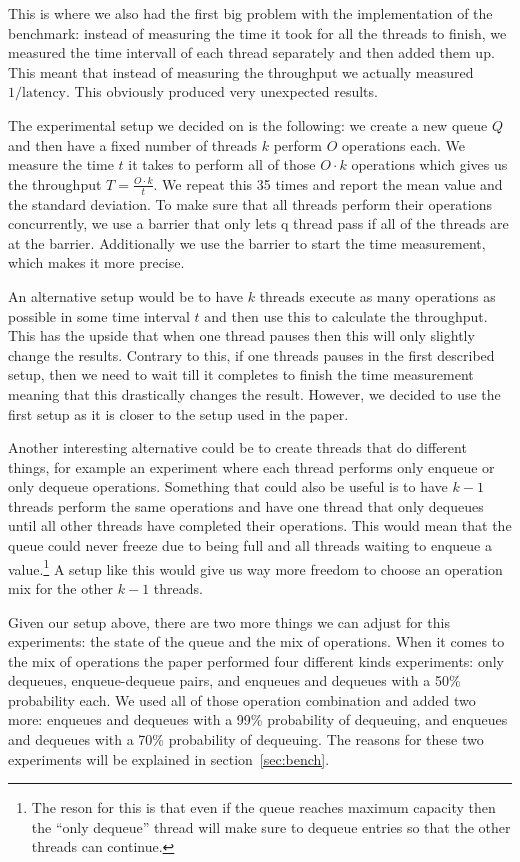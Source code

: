 \documentclass{article}      %
\begin{document}
This is where we also had the first big problem with the implementation of the benchmark: instead of measuring the time it took for all the threads to finish, we measured the time intervall of each thread separately and then added them up. This meant that instead of measuring the throughput we actually measured $1/\mathrm{latency}$. This obviously produced very unexpected results.

The experimental setup we decided on is the following: we create a new queue $Q$ and then have a fixed number of threads $k$ perform $O$ operations each. We measure the time $t$ it takes to perform all of those $O\cdot k$ operations which gives us the throughput $T = \frac{O\cdot k}{t}$. We repeat this 35 times and report the mean value and the standard deviation. To make sure that all threads perform their operations concurrently, we use a barrier that only lets q thread pass if all of the threads are at the barrier. Additionally we use the barrier to start the time measurement, which makes it more precise. 

An alternative setup would be to have $k$ threads execute as many operations as possible in some time interval $t$ and then use this to calculate the throughput. This has the upside that when one thread pauses then this will only slightly change the results. Contrary to this, if one threads pauses in the first described setup, then we need to wait till it completes to finish the time measurement meaning that this drastically changes the result. However, we decided to use the first setup as it is closer to the setup used in the paper. 

Another interesting alternative could be to create threads that do different things, for example an experiment where each thread performs only enqueue or only dequeue operations. Something that could also be useful is to have $k-1$ threads perform the same operations and have one thread that only dequeues until all other threads have completed their operations. This would mean that the queue could never freeze due to being full and all threads waiting to enqueue a value.\footnote{The reson for this is that even if the queue reaches maximum capacity then the ``only dequeue'' thread will make sure to dequeue entries so that the other threads can continue.} A setup like this would give us way more freedom to choose an operation mix for the other $k-1$ threads.

Given our setup above, there are two more things we can adjust for this experiments: the state of the queue and the mix of operations. When it comes to the mix of operations the paper performed four different kinds experiments: only dequeues, enqueue-dequeue pairs, and enqueues and dequeues with a 50\% probability each. We used all of those operation combination and added two more: enqueues and dequeues with a 99\% probability of dequeuing, and enqueues and dequeues with a 70\% probability of dequeuing. The reasons for these two experiments will be explained in section~\ref{sec:bench}.
\end{document}
